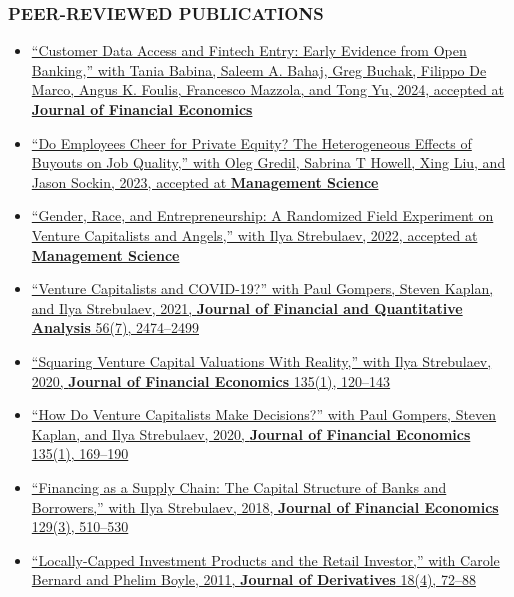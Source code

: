 \documentclass[11pt]{article}
\begin{document}
\subsubsection*{PEER-REVIEWED PUBLICATIONS}
\begin{itemize}[leftmargin=0pt, labelwidth=0cm, ]
    \item \href{https://papers.ssrn.com/sol3/papers.cfm?abstract_id=4071214}{%
        ``Customer Data Access and Fintech Entry: Early Evidence from Open Banking,'' 
        with Tania Babina, Saleem A. Bahaj, Greg Buchak, Filippo De Marco, Angus K. Foulis, Francesco Mazzola, and Tong Yu, 
        2024, accepted at \textbf{Journal of Financial Economics}}

    \item \href{https://papers.ssrn.com/sol3/papers.cfm?abstract_id=3912230}{%
        ``Do Employees Cheer for Private Equity? The Heterogeneous Effects of Buyouts on Job Quality,'' 
        with Oleg Gredil, Sabrina T Howell, Xing Liu, and Jason Sockin, 
        2023, accepted at \textbf{Management Science}}

    \item \href{https://papers.ssrn.com/sol3/papers.cfm?abstract_id=3301982}{%
        ``Gender, Race, and Entrepreneurship: A Randomized Field Experiment on Venture Capitalists and Angels,'' 
        with Ilya Strebulaev, 
        2022, accepted at \textbf{Management Science}}

    \item \href{https://papers.ssrn.com/sol3/papers.cfm?abstract_id=3669345}{%
        ``Venture Capitalists and COVID-19?'' 
        with Paul Gompers, Steven Kaplan, and Ilya Strebulaev, 
        2021, \textbf{Journal of Financial and Quantitative Analysis} 56(7), 2474--2499}

    \item \href{https://papers.ssrn.com/sol3/papers.cfm?abstract_id=2955455}{%
        ``Squaring Venture Capital Valuations With Reality,'' 
        with Ilya Strebulaev, 
        2020, \textbf{Journal of Financial Economics} 135(1), 120--143}

    \item \href{https://papers.ssrn.com/sol3/papers.cfm?abstract_id=2801385}{%
        ``How Do Venture Capitalists Make Decisions?'' 
        with Paul Gompers, Steven Kaplan, and Ilya Strebulaev, 
        2020, \textbf{Journal of Financial Economics} 135(1), 169--190}

    \item \href{https://papers.ssrn.com/sol3/papers.cfm?abstract_id=2347107}{%
        ``Financing as a Supply Chain: The Capital Structure of Banks and Borrowers,'' 
        with Ilya Strebulaev, 
        2018, \textbf{Journal of Financial Economics} 129(3), 510--530}

    \item \href{https://papers.ssrn.com/sol3/papers.cfm?abstract_id=1101796}{%
        ``Locally-Capped Investment Products and the Retail Investor,'' 
        with Carole Bernard and Phelim Boyle, 
        2011, \textbf{Journal of Derivatives} 18(4), 72--88}
\end{itemize}
\end{document}
